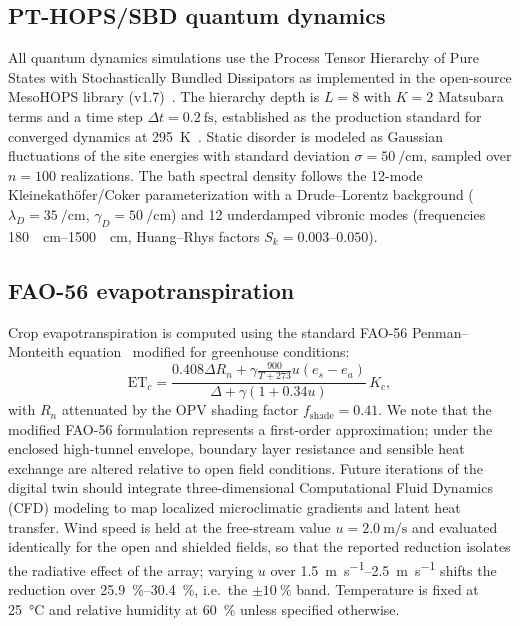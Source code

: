 \documentclass[onecolumn,a4paper,12pt]{article}
\begin{document}
\subsection*{PT-HOPS/SBD quantum dynamics}

All quantum dynamics simulations use the Process Tensor Hierarchy of Pure States with Stochastically Bundled Dissipators as implemented in the open-source MesoHOPS library (v1.7)~\cite{Varvelo2021}.
The hierarchy depth is $L = 8$ with $K = 2$ Matsubara terms and a time step $\Delta t = \qty{0.2}{\fs}$, established as the production standard for converged dynamics at \qty{295}{\kelvin}~\cite{Kouam2026}.
Static disorder is modeled as Gaussian fluctuations of the site energies with standard deviation $\sigma = \qty{50}{\per\cm}$, sampled over $n = 100$ realizations.
The bath spectral density follows the 12-mode Kleinekath\"{o}fer/Coker parameterization with a Drude--Lorentz background ($\lambda_D = \qty{35}{\per\cm}$, $\gamma_D = \qty{50}{\per\cm}$) and 12 underdamped vibronic modes (frequencies \qtyrange{180}{1500}{\per\cm}, Huang--Rhys factors $S_k = \numrange{0.003}{0.050}$).

\subsection*{FAO-56 evapotranspiration}

Crop evapotranspiration is computed using the standard FAO-56 Penman--Monteith equation~\cite{Allen1998} modified for greenhouse conditions:
\begin{equation}
\mathrm{ET}_c = \frac{0.408 \Delta R_n + \gamma \frac{900}{T+273} u (e_s - e_a)}{\Delta + \gamma(1 + 0.34 u)} \, K_c,
\end{equation}
with $R_n$ attenuated by the OPV shading factor $f_{\mathrm{shade}} = 0.41$.
We note that the modified FAO-56 formulation represents a first-order approximation; under the enclosed high-tunnel envelope, boundary layer resistance and sensible heat exchange are altered relative to open field conditions. Future iterations of the digital twin should integrate three-dimensional Computational Fluid Dynamics (CFD) modeling to map localized microclimatic gradients and latent heat transfer. Wind speed is held at the free-stream value $u = \qty{2.0}{\m\per\s}$ and evaluated identically for the open and shielded fields, so that the reported reduction isolates the radiative effect of the array; varying $u$ over \qtyrange{1.5}{2.5}{\m\per\s} shifts the reduction over \qtyrange{25.9}{30.4}{\percent}, i.e.\ the $\pm\qty{10}{\percent}$ band.
Temperature is fixed at \qty{25}{\celsius} and relative humidity at \qty{60}{\percent} unless specified otherwise.
\end{document}
